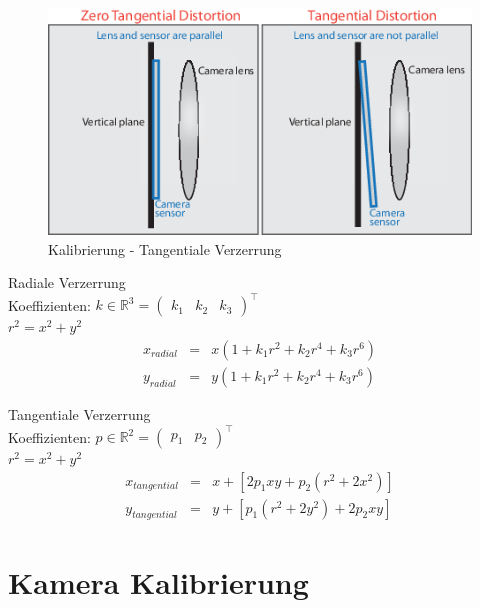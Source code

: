\begin{figure}
 \centering
 \includegraphics[width=1\textwidth]{media/calibration/calibration_tangentialdistortion.png}
 \caption{Kalibrierung - Tangentiale Verzerrung}
 \label{fig:calibration_tangential}
\end{figure}


\begin{multicols}{2}
\centering
Radiale Verzerrung \\
Koeffizienten: \( k \in \mathbb{R}^3 = \begin{pmatrix} k_1 & k_2 & k_3 \end{pmatrix}^\intercal \) \\
\(r^2=x^2+y^2 \) \\
\begin{eqnarray*}
x_{radial} &=& x(1+k_1r^2+k_2r^4+k_3r^6) \\
y_{radial} &=& y(1+k_1r^2+k_2r^4+k_3r^6)
\end{eqnarray*}

\columnbreak
\centering
Tangentiale Verzerrung \\
Koeffizienten: \( p \in \mathbb{R}^2 = \begin{pmatrix} p_1 & p_2 \end{pmatrix} ^\intercal \) \\
\(r^2=x^2+y^2 \) \\
\begin{eqnarray*}
 x_{tangential} &=& x+[2p_1xy+p_2(r^2+2x^2)] \\
 y_{tangential} &=& y+[p_1(r^2+2y^2)+2p_2xy]
\end{eqnarray*}
\end{multicols}


\section{Kamera Kalibrierung}

